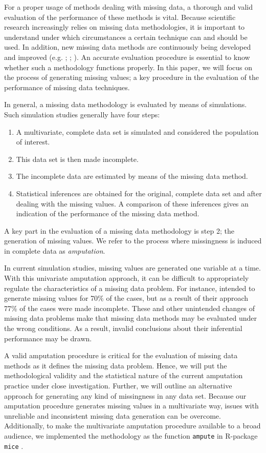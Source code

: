 \documentclass[11pt,a4paper]{article}
\newcommand{\code}[1]{\texttt{#1}}
\begin{document}
For a proper usage of methods dealing with missing data, a thorough and valid evaluation of the performance of these methods is vital. Because scientific research increasingly relies on missing data methodologies, it is important to understand under which circumstances a certain technique can and should be used. In addition, new missing data methods are continuously being developed and improved (e.g. \citealp{Vink2013}; \citealp{Fang2016}; \citealp{Kombo2016}). An accurate evaluation procedure is essential to know whether such a methodology functions properly. In this paper, we will focus on the process of generating missing values; a key procedure in the evaluation of the performance of missing data techniques. 

In general, a missing data methodology is evaluated by means of simulations. Such simulation studies generally have four steps: 

\begin{enumerate} 
\item A multivariate, complete data set is simulated and considered the population of interest. 
\item This data set is then made incomplete. 
\item The incomplete data are estimated by means of the missing data method. 
\item Statistical inferences are obtained for the original, complete data set and after dealing with the missing values. A comparison of these inferences gives an indication of the performance of the missing data method. 
\end{enumerate}

\noindent A key part in the evaluation of a missing data methodology is step 2; the generation of missing values. We refer to the process where missingness is induced in complete data as \textit{amputation}. 

In current simulation studies, missing values are generated one variable at a time. With this univariate amputation approach, it can be difficult to appropriately regulate the characteristics of a missing data problem. For instance, \citet[][p. 11]{Seaman2012} intended to generate missing values for 70\% of the cases, but as a result of their approach 77\% of the cases were made incomplete. These and other unintended changes of missing data problems make that missing data methods may be evaluated under the wrong conditions. As a result, invalid conclusions about their inferential performance may be drawn. 

A valid amputation procedure is critical for the evaluation of missing data methods as it defines the missing data problem. Hence, we will put the methodological validity and the statistical nature of the current amputation practice under close investigation. Further, we will outline an alternative approach for generating any kind of missingness in any data set. Because our amputation procedure generates missing values in a multivariate way, issues with unreliable and inconsistent missing data generation can be overcome. Additionally, to make the multivariate amputation procedure available to a broad audience, we implemented the methodology as the function \code{ampute} \citep{AmputeVignette} in R-package \code{mice} \citep{Stef2011}. 
\end{document}
